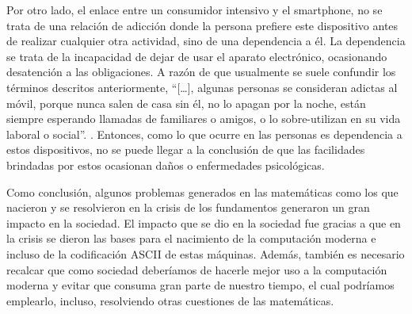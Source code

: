 \documentclass[letterpaper, 12 pt, conference]{ieeeconf}  %
\begin{document}
\begin{.}
Por otro lado, el enlace entre un consumidor intensivo y el smartphone, no se trata de una relación de adicción donde la persona prefiere este dispositivo antes de realizar cualquier otra actividad, sino de una dependencia a él. La dependencia se trata de la incapacidad de dejar de usar el aparato electrónico, ocasionando desatención a las obligaciones. A razón de que usualmente se suele confundir los términos descritos anteriormente, “[…], algunas personas se consideran adictas al móvil, porque nunca salen de casa sin él, no lo apagan por la noche, están siempre esperando llamadas de familiares o amigos, o lo sobre-utilizan en su vida laboral o social”. \cite{c16}. Entonces, como lo que ocurre en las personas es dependencia a estos dispositivos, no se puede llegar a la conclusión de que las facilidades brindadas por estos ocasionan daños o enfermedades psicológicas.
\smallskip

Como conclusión, algunos problemas generados en las matemáticas como los que nacieron y se resolvieron en la crisis de los fundamentos generaron un gran impacto en la sociedad. El impacto que se dio en la sociedad fue gracias a que en la crisis se dieron las bases para el nacimiento de la computación moderna e incluso de la codificación ASCII de estas máquinas. Además, también es necesario recalcar que como sociedad deberíamos de hacerle mejor uso a la computación moderna y evitar que consuma gran parte de nuestro tiempo, el cual podríamos emplearlo, incluso, resolviendo otras cuestiones de las matemáticas.
\medskip

\end{.}



\addtolength{\textheight}{-12cm}   %
\end{document}
